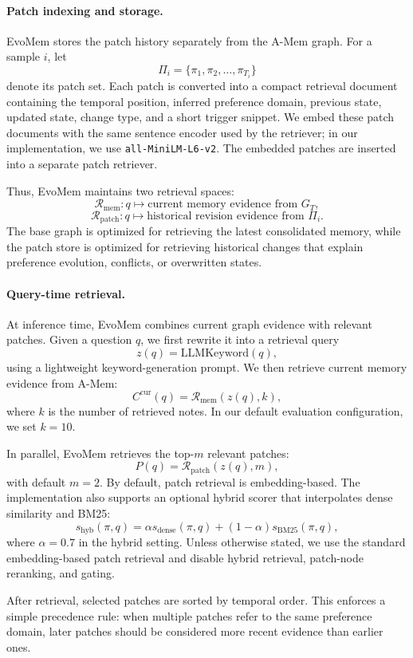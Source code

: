 \documentclass{llmxive}
\begin{document}
\paragraph{Patch indexing and storage.}
EvoMem stores the patch history separately from the A-Mem graph. For a sample $i$, let
\[
\Pi_i=\{\pi_1,\pi_2,\ldots,\pi_{T_i}\}
\]
denote its patch set. Each patch is converted into a compact retrieval document containing the temporal position, inferred preference domain, previous state, updated state, change type, and a short trigger snippet. We embed these patch documents with the same sentence encoder used by the retriever; in our implementation, we use \texttt{all-MiniLM-L6-v2}. The embedded patches are inserted into a separate patch retriever.

Thus, EvoMem maintains two retrieval spaces:
\[
\mathcal{R}_{\mathrm{mem}}: q \mapsto \text{current memory evidence from } G_T,
\]
\[
\mathcal{R}_{\mathrm{patch}}: q \mapsto \text{historical revision evidence from } \Pi_i.
\]
The base graph is optimized for retrieving the latest consolidated memory, while the patch store is optimized for retrieving historical changes that explain preference evolution, conflicts, or overwritten states.

\paragraph{Query-time retrieval.}
At inference time, EvoMem combines current graph evidence with relevant patches. Given a question $q$, we first rewrite it into a retrieval query
\[
z(q)=\mathrm{LLMKeyword}(q),
\]
using a lightweight keyword-generation prompt. We then retrieve current memory evidence from A-Mem:
\[
C^{\mathrm{cur}}(q)=\mathcal{R}_{\mathrm{mem}}(z(q),k),
\]
where $k$ is the number of retrieved notes. In our default evaluation configuration, we set $k=10$.

In parallel, EvoMem retrieves the top-$m$ relevant patches:
\[
P(q)=\mathcal{R}_{\mathrm{patch}}(z(q),m),
\]
with default $m=2$. By default, patch retrieval is embedding-based. The implementation also supports an optional hybrid scorer that interpolates dense similarity and BM25:
\[
s_{\mathrm{hyb}}(\pi,q)
=
\alpha s_{\mathrm{dense}}(\pi,q)
+
(1-\alpha)s_{\mathrm{BM25}}(\pi,q),
\]
where $\alpha=0.7$ in the hybrid setting. Unless otherwise stated, we use the standard embedding-based patch retrieval and disable hybrid retrieval, patch-node reranking, and gating.

After retrieval, selected patches are sorted by temporal order. This enforces a simple precedence rule: when multiple patches refer to the same preference domain, later patches should be considered more recent evidence than earlier ones.
\end{document}

